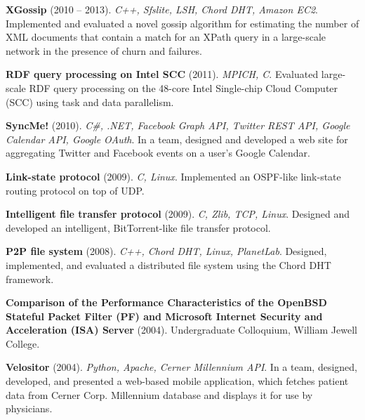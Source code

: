 \documentclass[margin,line]{resume}
\begin{document}
\begin{resume}
    \vspace{-2mm}    
    \textbf{XGossip} (2010 -- 2013). \textsl{C++, Sfslite, LSH, Chord DHT, Amazon EC2}. Implemented and evaluated a novel gossip algorithm for estimating the number of XML documents that contain a match for an XPath query in a large-scale network in the presence of churn and failures.

\vspace{-2mm}
    \textbf{RDF query processing on Intel SCC} (2011). \textsl{MPICH, C}. Evaluated large-scale RDF query processing on the 48-core Intel Single-chip Cloud Computer (SCC) using task and data parallelism.
    
\vspace{-2mm}
    \textbf{SyncMe!} (2010). \textsl{C\#, .NET, Facebook Graph API, Twitter REST API, Google Calendar API, Google OAuth}. In a team, designed and developed a web site for aggregating Twitter and Facebook events on a user's Google Calendar.

\vspace{-2mm}
    \textbf{Link-state protocol} (2009). \textsl{C, Linux}. Implemented an OSPF-like link-state routing protocol on top of UDP.

\vspace{-2mm}
    \textbf{Intelligent file transfer protocol} (2009). \textsl{C, Zlib, TCP, Linux}. Designed and developed an intelligent, BitTorrent-like file transfer protocol.

\vspace{-2mm}
    \textbf{P2P file system} (2008). \textsl{C++, Chord DHT, Linux, PlanetLab}. Designed, implemented, and evaluated a distributed file system using the Chord DHT framework.

    
\vspace{-2mm}
    \textbf{Comparison of the Performance Characteristics of the OpenBSD Stateful Packet Filter (PF) and Microsoft Internet Security and Acceleration (ISA) Server} (2004). Undergraduate Colloquium, William Jewell College.

\vspace{-2mm}    
    \textbf{Velositor} (2004). \textsl{Python, Apache, Cerner Millennium API}. In a team, designed, developed, and presented a web-based mobile application, which fetches patient data from Cerner Corp. Millennium database and displays it for use by physicians.


\end{resume}
\end{document}
